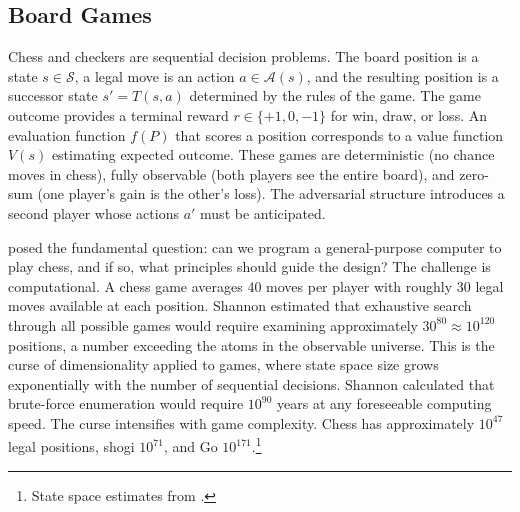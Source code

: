 
\subsection{Board Games}

Chess and checkers are sequential decision problems. The board position is a state $s \in \mathcal{S}$, a legal move is an action $a \in \mathcal{A}(s)$, and the resulting position is a successor state $s' = T(s,a)$ determined by the rules of the game. The game outcome provides a terminal reward $r \in \{+1, 0, -1\}$ for win, draw, or loss. An evaluation function $f(P)$ that scores a position corresponds to a value function $V(s)$ estimating expected outcome. These games are deterministic (no chance moves in chess), fully observable (both players see the entire board), and zero-sum (one player's gain is the other's loss). The adversarial structure introduces a second player whose actions $a'$ must be anticipated.

\citet{Shannon1950} posed the fundamental question: can we program a general-purpose computer to play chess, and if so, what principles should guide the design? The challenge is computational. A chess game averages 40 moves per player with roughly 30 legal moves available at each position. Shannon estimated that exhaustive search through all possible games would require examining approximately $30^{80} \approx 10^{120}$ positions, a number exceeding the atoms in the observable universe. This is the curse of dimensionality applied to games, where state space size grows exponentially with the number of sequential decisions. Shannon calculated that brute-force enumeration would require $10^{90}$ years at any foreseeable computing speed. The curse intensifies with game complexity. Chess has approximately $10^{47}$ legal positions, shogi $10^{71}$, and Go $10^{171}$.\footnote{State space estimates from \citet{Igami2020}.}

